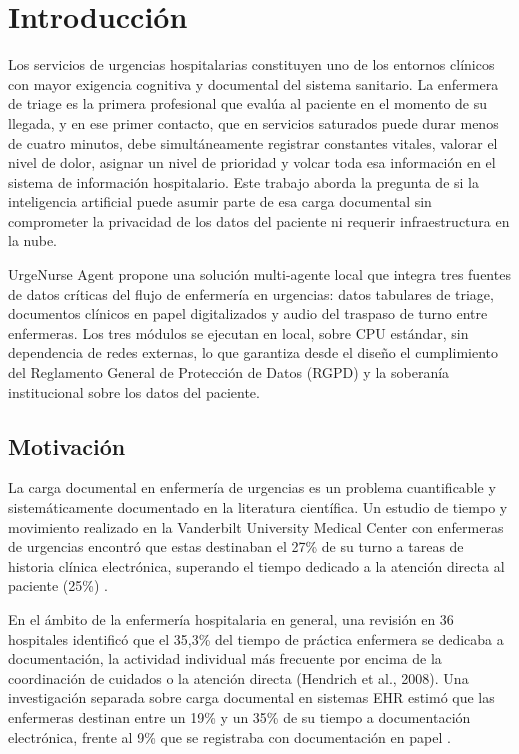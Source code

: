 
\section{Introducción}

Los servicios de urgencias hospitalarias constituyen uno de los entornos clínicos con mayor exigencia cognitiva y documental del sistema sanitario. La enfermera de triage es la primera profesional que evalúa al paciente en el momento de su llegada, y en ese primer contacto, que en servicios saturados puede durar menos de cuatro minutos, debe simultáneamente registrar constantes vitales, valorar el nivel de dolor, asignar un nivel de prioridad y volcar toda esa información en el sistema de información hospitalario. Este trabajo aborda la pregunta de si la inteligencia artificial puede asumir parte de esa carga documental sin comprometer la privacidad de los datos del paciente ni requerir infraestructura en la nube.

UrgeNurse Agent propone una solución multi-agente local que integra tres fuentes de datos críticas del flujo de enfermería en urgencias: datos tabulares de triage, documentos clínicos en papel digitalizados y audio del traspaso de turno entre enfermeras. Los tres módulos se ejecutan en local, sobre CPU estándar, sin dependencia de redes externas, lo que garantiza desde el diseño el cumplimiento del Reglamento General de Protección de Datos (RGPD) y la soberanía institucional sobre los datos del paciente.


\subsection{Motivación}

La carga documental en enfermería de urgencias es un problema cuantificable y sistemáticamente documentado en la literatura científica. Un estudio de tiempo y movimiento realizado en la Vanderbilt University Medical Center con enfermeras de urgencias encontró que estas destinaban el 27\% de su turno a tareas de historia clínica electrónica, superando el tiempo dedicado a la atención directa al paciente (25\%) \parencite{bakhoum2021at}.

En el ámbito de la enfermería hospitalaria en general, una revisión en 36 hospitales identificó que el 35,3\% del tiempo de práctica enfermera se dedicaba a documentación, la actividad individual más frecuente por encima de la coordinación de cuidados o la atención directa (Hendrich et al., 2008). Una investigación separada sobre carga documental en sistemas EHR estimó que las enfermeras destinan entre un 19\% y un 35\% de su tiempo a documentación electrónica, frente al 9\% que se registraba con documentación en papel \parencite{levy2024documentation}.


